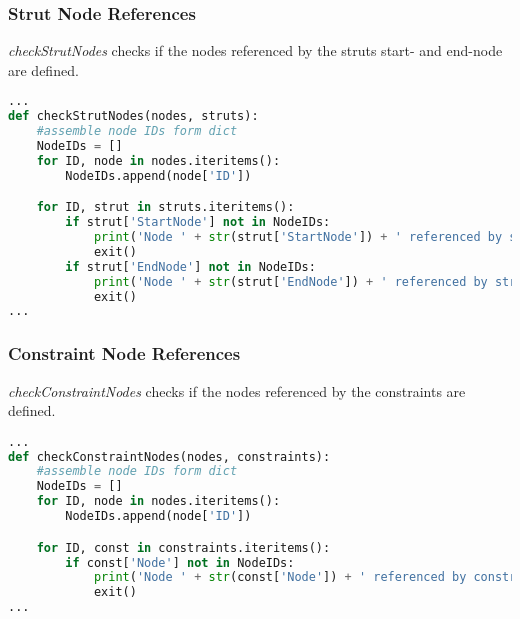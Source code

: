 \pagebreak

\subsubsection{Strut Node References}
\label{sec:inputcheck-checkStrutNodes}

\textit{checkStrutNodes} checks if the nodes referenced by the struts start- and end-node are defined.

\begin{inconsolata}
\begin{minipage}{\linewidth}
\begin{lstlisting}[language=python]
...
def checkStrutNodes(nodes, struts):
    #assemble node IDs form dict
    NodeIDs = []
    for ID, node in nodes.iteritems():
        NodeIDs.append(node['ID'])

    for ID, strut in struts.iteritems():
        if strut['StartNode'] not in NodeIDs:
            print('Node ' + str(strut['StartNode']) + ' referenced by strut ' + str(strut['ID']) + ' but not defined.')
            exit()
        if strut['EndNode'] not in NodeIDs:
            print('Node ' + str(strut['EndNode']) + ' referenced by strut ' + str(strut['ID']) + ' but not defined.')
            exit()
...
\end{lstlisting}
\end{minipage}
\end{inconsolata}

\subsubsection{Constraint Node References}
\label{sec:inputcheck-checkConstraintNodes}

\textit{checkConstraintNodes} checks if the nodes referenced by the constraints are defined.

\begin{inconsolata}
\begin{minipage}{\linewidth}
\begin{lstlisting}[language=python]
...
def checkConstraintNodes(nodes, constraints):
    #assemble node IDs form dict
    NodeIDs = []
    for ID, node in nodes.iteritems():
        NodeIDs.append(node['ID'])

    for ID, const in constraints.iteritems():
        if const['Node'] not in NodeIDs:
            print('Node ' + str(const['Node']) + ' referenced by constraint ' + str(ID) + ' but not defined.')
            exit()
...
\end{lstlisting}
\end{minipage}
\end{inconsolata}

